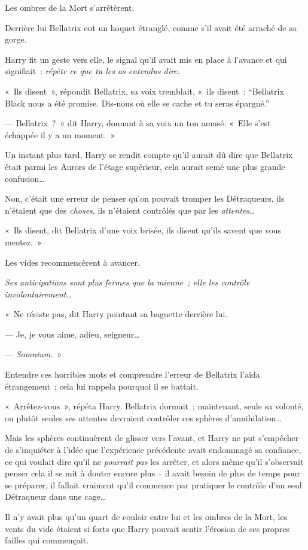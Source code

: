 Les ombres de la Mort s'arrêtèrent.

Derrière lui Bellatrix eut un hoquet étranglé, comme s'il avait été arraché de sa gorge.

Harry fit un geste vers elle, le signal qu'il avait mis en place à l'avance et qui signifiait~: \emph{répète ce que tu les as entendus dire}.

«~Ils disent~», répondit Bellatrix, sa voix tremblait, «~ils disent~: “Bellatrix Black nous a été promise. Dis-nous où elle se cache et tu seras épargné.”

--- Bellatrix~?~» dit Harry, donnant à sa voix un ton amusé. «~Elle s'est échappée il y a un moment.~»

Un instant plus tard, Harry se rendit compte qu'il aurait dû dire que Bellatrix était parmi les Aurors de l'étage supérieur, cela aurait semé une plus grande confusion…

Non, c'était une erreur de penser qu'on pouvait tromper les Détraqueurs, ils n'étaient que des \emph{choses}, ils n'étaient contrôlés que par les \emph{attentes}…

«~Ils disent, dit Bellatrix d'une voix brisée, ils disent qu'ils savent que vous mentez.~»

Les vides recommencèrent à avancer.

\emph{Ses anticipations sont plus fermes que la mienne~; elle les contrôle involontairement…}

«~Ne résiste pas, dit Harry pointant sa baguette derrière lui.

--- Je, je vous aime, adieu, seigneur…

--- \emph{Somnium.}~»

Entendre ces horribles mots et comprendre l'erreur de Bellatrix l'aida étrangement~; cela lui rappela pourquoi il se battait.

«~Arrêtez-vous~», répéta Harry. Bellatrix dormait~; maintenant, seule sa volonté, ou plutôt seules ses attentes devraient contrôler ces sphères d'annihilation…

Mais les sphères continuèrent de glisser vers l'avant, et Harry ne put s'empêcher de s'inquiéter à l'idée que l'expérience précédente avait endommagé sa confiance, ce qui voulait dire qu'il ne \emph{pourrait pas} les arrêter, et alors même qu'il s'observait penser cela il se mit à douter encore plus -- il avait besoin de plus de temps pour se préparer, il fallait vraiment qu'il commence par pratiquer le contrôle d'un seul Détraqueur dans une cage…

Il n'y avait plus qu'un quart de couloir entre lui et les ombres de la Mort, les vents du vide étaient si forts que Harry pouvait sentir l'érosion de ses propres failles qui commençait.


